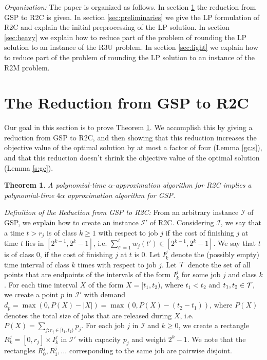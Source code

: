\documentclass[11pt]{article}
\newtheorem{thm}{Theorem}
\begin{document}
{\em Organization:}
The paper is organized as follows. In
section \ref{sec:reduce} the reduction from GSP to R2C is given.
In section \ref{sec:preliminaries} we give the LP formulation
of R2C and explain the initial preprocessing of the LP solution.
In section \ref{sec:heavy}
we explain how to reduce part of the problem
of rounding the LP solution to an instance of the R3U problem.
In section \ref{sec:light}
we explain how to reduce part of the problem
of rounding the LP solution to an instance of the R2M problem.


\section{The Reduction from GSP to R2C}
\label{sec:reduce} 
Our goal in this section is to prove Theorem \ref{red}.
We accomplish this by giving a reduction from GSP
to R2C, and then showing that this reduction increases the objective 
value of the optimal solution by at most a factor of four
(Lemma \ref{gc:s}), and that this reduction doesn't shrink the
objective value of the optimal solution (Lemma \ref{s:gc}).

\begin{thm}
\label{red}
A polynomial-time $\alpha$-approximation algorithm for R2C 
implies a polynomial-time $4\alpha$ approximation algorithm for GSP.
\end{thm}


\medskip

{\em Definition of the Reduction from GSP to R2C:}
From an arbitrary instance $\mathcal I$ of GSP,
we explain how to create an instance $\mathcal I'$ of R2C.
Considering $\mathcal I$,
we say that a time $t > r_j$ is of class $k \geq 1$ with respect to job $j$ if 
the cost of finishing $j$ at time $t$ lies in $[2^{k-1},2^k-1]$, 
i.e.  $\sum_{t'=1}^t w_{j}(t')  \in [2^{k-1},2^k-1]$. We say that $t$ is of class $0$, if the cost of finishing $j$ at $t$ is $0$.
Let $I_k^j$ denote the (possibly empty) time interval of class $k$ times with respect to job $j$.
Let $\cal{T}$ denote the set of all points that are endpoints of the intervals 
of the form $I_k^j$ for some job $j$ and class $k$. 
For each time interval $X$ of the form $X=[t_1,t_2)$, 
where $t_1 < t_2$ and $t_1,t_2 \in \cal{T}$, we create a point $p$ in $\mathcal I'$
with demand
$d_p = \max(0,P(X) - |X|) = \max(0,P(X)-(t_2 - t_1))$, where $P(X)$ denotes the total size of jobs that are released during $X$, 
i.e. $P(X) = \sum_{j: r_j \in [t_1,t_2)} p_j$.
For each job $j$ in $\mathcal I$ 
and $k\geq 0$, we create a rectangle $R^j_k = [0,r_j] \times I^j_k$
in $\mathcal I'$ with capacity $p_j$ and weight $2^k-1$.
We note that the rectangles $R^j_0,R^j_1,\ldots$ corresponding to the same job are pairwise disjoint.
\end{document}
